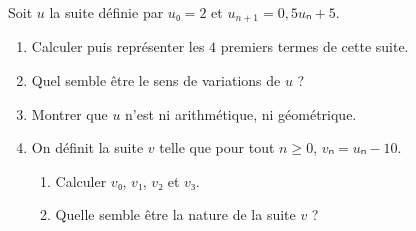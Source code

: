 \documentclass[
	classe=$1^{ere}STI2D$
]{évaluation}
\begin{document}
\begin{exercice}[7]
	Soit $u$ la suite définie par $u₀ = 2$ et $u_{n+1} = 0,5uₙ + 5$.

	\begin{enumerate}
		\item Calculer puis représenter les $4$ premiers termes de cette suite.

		\item Quel semble être le sens de variations de $u$ ?

		\item Montrer que $u$ n'est ni arithmétique, ni géométrique.
		\item On définit la suite $v$ telle que pour tout $n ≥ 0$, $vₙ = uₙ - 10$.
		      \begin{enumerate}
			      \item Calculer $v₀$, $v₁$, $v₂$ et $v₃$.

			      \item Quelle semble être la nature de la suite $v$ ?


\end{enumerate}
\end{enumerate}
\end{exercice}
\end{document}
